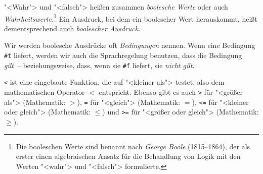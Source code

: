 "<Wahr"> und "<falsch"> heißen zusammen \textit{boolesche
  Werte} oder auch
\textit{Wahrheitswerte}.\footnote{Die booleschen
  Werte sind benannt nach \textit{George Boole} (1815--1864), der als
  erster einen algebraischen Ansatz für die Behandlung von Logik mit
  den Werten "<wahr"> und "<falsch"> formulierte.}  Ein Ausdruck, bei
dem ein boolescher Wert herauskommt, heißt dementsprechend auch
\textit{boolescher Ausdruck}.

Wir werden boolesche Ausdrücke oft
\textit{Bedingungen} nennen.  Wenn eine Bedingung
\lstinline{#t} liefert, werden wir auch die Sprachregelung benutzen, dass
die Bedingung \textit{gilt}~-- beziehungsweise, dass, wenn sie
\lstinline{#f} liefert, sie \textit{nicht gilt}.

\lstinline{<} ist eine eingebaute Funktion, die
auf "<kleiner als"> testet, also dem mathematischen Operator $<$
entspricht.  Ebenso gibt es auch \lstinline{>} für
"<größer als"> (Mathematik: $>$), \lstinline{=} für
"<gleich"> (Mathematik: $=$), \lstinline{<=} für "<kleiner oder
gleich"> (Mathematik: $\leq$) und \lstinline{>=}
für "<größer oder gleich"> (Mathematik: $\geq$).

